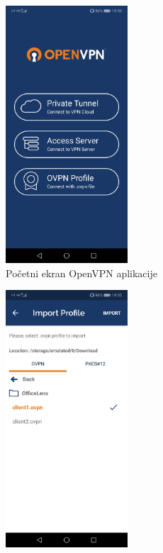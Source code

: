 \begin{figure}[h]
	\centering
	\begin{subfigure}{0.49\textwidth}
		\centering
		\includegraphics[width = 0.5\textwidth]{slike/OpenVPN/Screenshot_20181214-195518}
		\caption{Početni ekran OpenVPN aplikacije}
		\label{fig:screenshot20181214-195518}
	\end{subfigure}
	\begin{subfigure}{0.49\textwidth}
		\centering
		\includegraphics[width = 0.5\textwidth]{slike/OpenVPN/Screenshot_20181214-195554}

\end{subfigure}
\end{figure}
